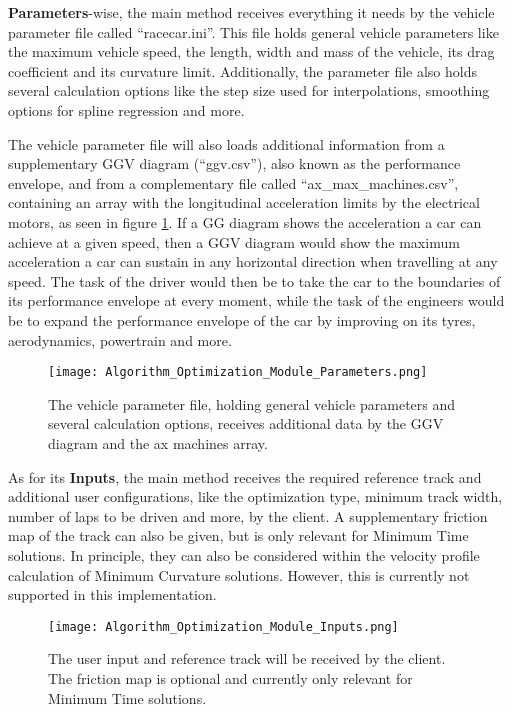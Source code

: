 \textbf{Parameters}-wise, the main method receives everything it needs by the vehicle parameter file called ``racecar.ini''. This file holds general vehicle parameters like the maximum vehicle speed, the length, width and mass of the vehicle, its drag coefficient and its curvature limit. Additionally, the parameter file also holds several calculation options like the step size used for interpolations, smoothing options for spline regression and more.

The vehicle parameter file will also loads additional information from a supplementary GGV diagram (``ggv.csv''), also known as the performance envelope, and from a complementary file called ``ax\_max\_machines.csv'', containing an array with the longitudinal acceleration limits by the electrical motors, as seen in figure \ref{fig:Optimization Algorithm Module Parameters}. If a GG diagram shows the acceleration a car can achieve at a given speed, then a GGV diagram would show the maximum acceleration a car can sustain in any horizontal direction when travelling at any speed. The task of the driver would then be to take the car to the boundaries of its performance envelope at every moment, while the task of the engineers would be to expand the performance envelope of the car by improving on its tyres, aerodynamics, powertrain and more. %
\begin{figure}[H]
    \centering
    \texttt{[image: Algorithm\_Optimization\_Module\_Parameters.png]}
    \caption{The vehicle parameter file, holding general vehicle parameters and several calculation options, receives additional data by the GGV diagram and the ax machines array.}
    \label{fig:Optimization Algorithm Module Parameters}
\end{figure}

As for its \textbf{Inputs}, the main method receives the required reference track and additional user configurations, like the optimization type, minimum track width, number of laps to be driven and more, by the client. A supplementary friction map of the track can also be given, but is only relevant for Minimum Time solutions. In principle, they can also be considered within the velocity profile calculation of Minimum Curvature solutions. However, this is currently not supported in this implementation. %
\begin{figure}[H]
    \centering
    \texttt{[image: Algorithm\_Optimization\_Module\_Inputs.png]}
    \caption{The user input and reference track will be received by the client. The friction map is optional and currently only relevant for Minimum Time solutions.}
    \label{fig:Optimization Algorithm Module Inputs}
\end{figure}

